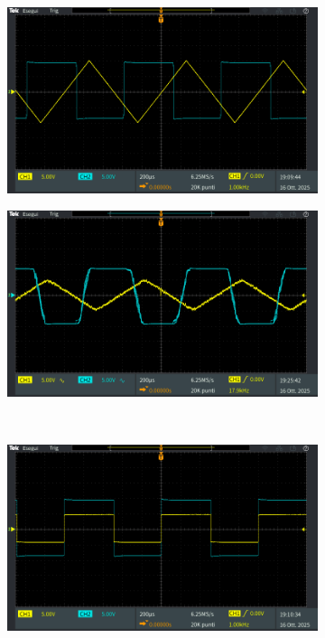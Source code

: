\documentclass[a4paper,12pt]{article}
\begin{document}
\begin{figure}[h]
    \centering
    \begin{subfigure}{0.49\linewidth}
        \includegraphics[width = \linewidth]{immagini/schmitt/schmitt_vin_vout.png}
        \caption{}
    \end{subfigure}
    \begin{subfigure}{0.49\linewidth}
        \includegraphics[width = \linewidth]{immagini/schmitt/schmitt_vin_vout_rumoroso.png}
        \caption{}
    \end{subfigure}
    \\[0.5cm]
    \begin{subfigure}{0.49\linewidth}
        \includegraphics[width = \linewidth]{immagini/schmitt/schmitt_v+_vout.png}

\end{subfigure}
\end{figure}
\end{document}
